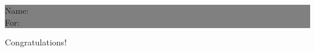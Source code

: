 \documentclass[10pt]{article}
\begin{document}
\begin{titlepage}
	\colorbox{grey}{
		\parbox[t]{0.93\textwidth}{ 
			\parbox[t]{0.91\textwidth}{ 
				\raggedleft 
				\fontsize{50pt}{80pt}\selectfont 
				\vspace{0.7cm} 

				Name: \\
				For: \\
				\vspace{0.7cm} 
			}
		}
	}

	\vfill 
	
	Congratulations!\\

\end{titlepage}
\end{document}
